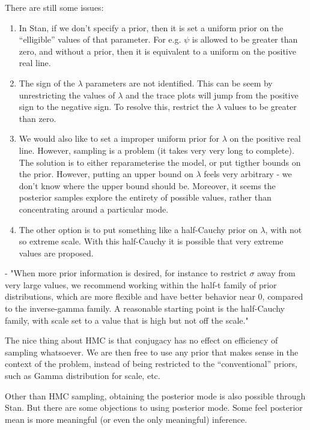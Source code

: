\documentclass[english, 11pt]{article}
\begin{document}
There are still some issues:
\begin{enumerate}
	\item In Stan, if we don't specify a prior, then it is set a uniform prior on the ``elligible'' values of that parameter. For e.g. $\psi$ is allowed to be greater than zero, and without a prior, then it is equivalent to a uniform on the positive real line.
	\item The sign of the $\lambda$ parameters are not identified. This can be seem by unrestricting the values of $\lambda$ and the trace plots will jump from the positive sign to the negative sign. To resolve this, restrict the $\lambda$ values to be greater than zero.
	\item We would also like to set a improper uniform prior for $\lambda$ on the positive real line. However, sampling is a problem (it takes very very long to complete). The solution is to either reparameterise the model, or put tigther bounds on the prior. However, putting an upper bound on $\lambda$ feels very arbitrary - we don't know where the upper bound should be. Moreover, it seems the posterior samples explore the entirety of possible values, rather than concentrating around a particular mode.
	\item The other option is to put something like a half-Cauchy prior on $\lambda$, with not so extreme scale. With this half-Cauchy it is possible that very extreme values are proposed.
\end{enumerate}

\cite{gelman2006prior} - "When more prior information is desired, for instance to restrict $\sigma$ away from very large values, we recommend working within the half-t family of prior distributions, which are more flexible and have better behavior near 0, compared to the inverse-gamma family. A reasonable starting point is the half-Cauchy family, with scale set to a value that is high but not off the scale."

The nice thing about HMC is that conjugacy has no effect on efficiency of sampling whatsoever. We are then free to use any prior that makes sense in the context of the problem, instead of being restricted to the ``conventional'' priors, such as Gamma distribution for scale, etc.

Other than HMC sampling, obtaining the posterior mode is also possible through Stan. But there are some objections to using posterior mode. Some feel posterior mean is more meaningful (or even the only meaningful) inference.
\end{document}
